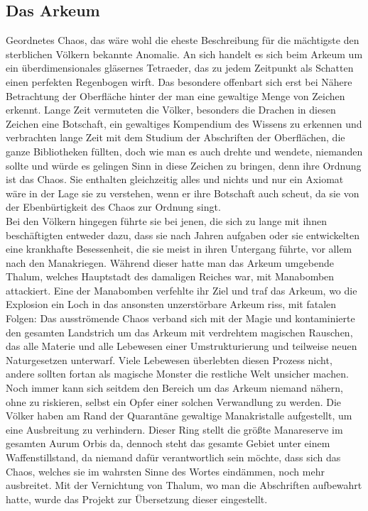 \documentclass[a4paper,12pt,oneside]{book}
\begin{document}
\subsection{Das Arkeum}\label{Arkeum}
Geordnetes Chaos, das wäre wohl die eheste Beschreibung für die mächtigste den sterblichen Völkern bekannte Anomalie. An sich handelt es sich beim Arkeum um ein überdimensionales gläsernes Tetraeder, das zu jedem Zeitpunkt als Schatten einen perfekten Regenbogen wirft. Das besondere offenbart sich erst bei Nähere Betrachtung der Oberfläche hinter der man eine gewaltige Menge von Zeichen erkennt. Lange Zeit vermuteten die Völker, besonders die Drachen in diesen Zeichen eine Botschaft, ein gewaltiges Kompendium des Wissens zu erkennen und verbrachten lange Zeit mit dem Studium der Abschriften der Oberflächen, die ganze Bibliotheken füllten, doch wie man es auch drehte und wendete, niemanden sollte und würde es gelingen Sinn in diese Zeichen zu bringen, denn ihre Ordnung ist das Chaos. Sie enthalten gleichzeitig alles und nichts und nur ein Axiomat wäre in der Lage sie zu verstehen, wenn er ihre Botschaft auch scheut, da sie von der Ebenbürtigkeit des Chaos zur Ordnung singt. 
\\Bei den Völkern hingegen führte sie bei jenen, die sich zu lange mit ihnen beschäftigten entweder dazu, dass sie nach Jahren aufgaben oder sie entwickelten eine krankhafte Besessenheit, die sie meist in ihren Untergang führte, vor allem nach den Manakriegen. Während dieser hatte man das Arkeum umgebende Thalum, welches Hauptstadt des damaligen Reiches war, mit Manabomben attackiert. Eine der Manabomben verfehlte ihr Ziel und traf das Arkeum, wo die Explosion ein Loch in das ansonsten unzerstörbare Arkeum riss, mit fatalen Folgen: Das ausströmende Chaos verband sich mit der Magie und kontaminierte den gesamten Landstrich um das Arkeum mit verdrehtem magischen Rauschen, das alle Materie und alle Lebewesen einer Umstrukturierung und teilweise neuen Naturgesetzen unterwarf. Viele Lebewesen überlebten diesen Prozess nicht, andere sollten fortan als magische Monster die restliche Welt unsicher machen.
\\Noch immer kann sich seitdem den Bereich um das Arkeum niemand nähern, ohne zu riskieren, selbst ein Opfer einer solchen Verwandlung zu werden. Die Völker haben am Rand der Quarantäne gewaltige Manakristalle aufgestellt, um eine Ausbreitung zu verhindern. Dieser Ring stellt die größte Manareserve im gesamten Aurum Orbis da, dennoch steht das gesamte Gebiet unter einem Waffenstillstand, da niemand dafür verantwortlich sein möchte, dass sich das Chaos, welches sie im wahrsten Sinne des Wortes eindämmen, noch mehr ausbreitet. Mit der Vernichtung von Thalum, wo man die Abschriften aufbewahrt hatte, wurde das Projekt zur Übersetzung dieser eingestellt.
\end{document}
